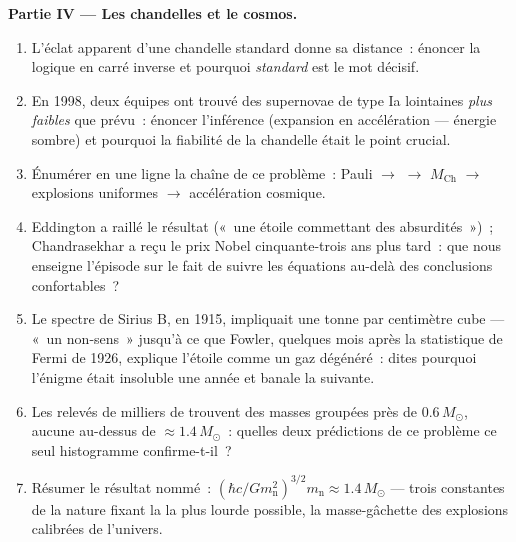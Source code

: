 \begin{problem}
\medskip\noindent\textbf{Partie IV --- Les chandelles et le
cosmos.}
\begin{enumerate}[resume]
  \item L'éclat apparent d'une chandelle standard donne sa
        distance~: énoncer la logique en carré inverse et pourquoi
        \emph{standard} est le mot décisif.
  \item En 1998, deux équipes ont trouvé des supernovae de type Ia
        lointaines \emph{plus faibles} que prévu~: énoncer
        l'inférence (expansion en accélération --- énergie sombre)
        et pourquoi la fiabilité de la chandelle était le point
        crucial.
  \item Énumérer en une ligne la chaîne de ce problème~: Pauli
        $\to$  $\to$ $M_{\text{Ch}}$ $\to$
        explosions uniformes $\to$ accélération cosmique.
  \item Eddington a raillé le résultat («~une étoile commettant des
        absurdités~»)~; Chandrasekhar a reçu le prix Nobel
        cinquante-trois ans plus tard~: que nous enseigne
        l'épisode sur le fait de suivre les équations au-delà des
        conclusions confortables~?
  \item Le spectre de Sirius B, en 1915, impliquait une tonne par
        centimètre cube --- «~un non-sens~» jusqu'à ce que Fowler,
        quelques mois après la statistique de Fermi de 1926,
        explique l'étoile comme un gaz dégénéré~: dites pourquoi
        l'énigme était insoluble une année et banale la suivante.
  \item Les relevés de milliers de  trouvent des
        masses groupées près de $0.6\,M_\odot$, aucune au-dessus de
        $\approx1.4\,M_\odot$~: quelles deux prédictions de ce
        problème ce seul histogramme confirme-t-il~?
  \item Résumer le résultat nommé~: $(\hbar c/Gm_{\text{n}}^2)^{
        3/2}m_{\text{n}} \approx 1.4\,M_\odot$ --- trois constantes
        de la nature fixant la  la plus lourde
        possible, la masse-gâchette des explosions calibrées de
        l'univers.
\end{enumerate}
\end{problem}
